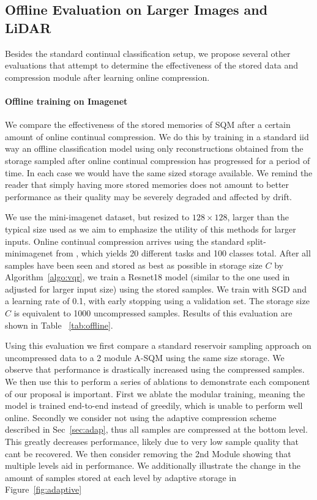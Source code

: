 \documentclass[colorinlistoftodos]{article} %
\begin{document}
\subsection{Offline Evaluation on Larger Images and LiDAR}
\label{sec:off}
Besides the standard continual classification setup, we propose several other evaluations that attempt to determine the effectiveness of the stored data and compression module after learning online compression. %

\paragraph{Offline training on Imagenet} We compare the effectiveness of the stored memories of SQM after a certain amount of online continual compression. We do this by training in a standard iid way an offline classification model using only reconstructions obtained from the storage sampled after online continual compression has progressed for a period of time.  In each case we would have the same sized storage available. We remind the reader that simply having more stored memories does not amount to better performance as their quality may be severely degraded and affected by drift. 

We use the mini-imagenet dataset, but resized to $128 \times 128$, larger than the typical size used as we aim to emphasize the utility of this methods for larger inputs. Online continual compression arrives using the standard split-minimagenet from \cite{chaudhry2019continual}, which yields 20 different tasks and 100 classes total. After all samples have been seen and stored as best as possible in storage size $C$ by Algorithm~\ref{algo:vqr}, we train a Resnet18 model (similar to the one used in \cite{chaudhry2019continual} adjusted for larger input size) using the stored samples. We train with SGD and a learning rate of 0.1, with early stopping using a validation set. The storage size $C$ is equivalent to 1000 uncompressed samples. Results of this evaluation are shown in Table ~\ref{tab:offline}. 


Using this evaluation we first compare a standard reservoir sampling approach on uncompressed data to a 2 module A-SQM using the same size storage. We observe that performance is drastically increased using the compressed samples. We then use this to perform a series of ablations to demonstrate each component of our proposal is important. First we ablate the modular training, meaning the model is trained end-to-end instead of greedily, which is unable to perform well online. Secondly we consider not using the adaptive compression scheme described in Sec~\ref{sec:adap}, thus all samples are compressed at the bottom level. This greatly decreases performance, likely due to very low sample quality that cant be recovered. We then consider removing the 2nd Module showing that multiple levels aid in performance. We additionally illustrate the change in the amount of samples stored at each level by adaptive storage in Figure~\ref{fig:adaptive}
\end{document}
